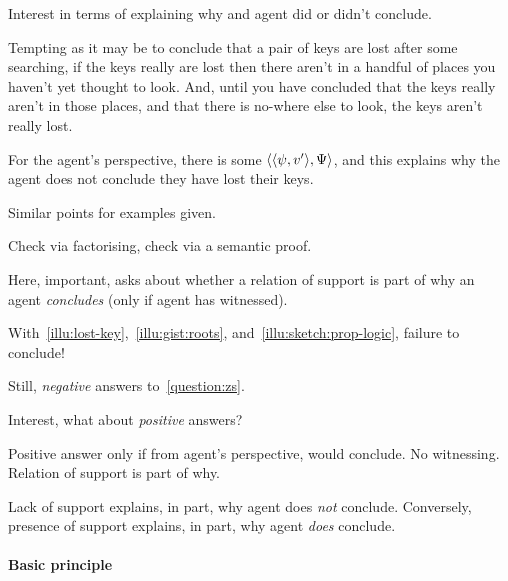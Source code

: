 \begin{note}
  {
    \color{red}
    Interest in terms of explaining why and agent did or didn't conclude.
  }

  \begin{illustration}
    \label{illu:lost-key}
    Tempting as it may be to conclude that a pair of keys are lost after some searching, if the keys really are lost then there aren't in a handful of places you haven't yet thought to look. And, until you have concluded that the keys really aren't in those places, and that there is no-where else to look, the keys aren't really lost.
  \end{illustration}

  For the agent's perspective, there is some \(\langle \langle \psi, v' \rangle, \Psi \rangle\), and this explains why the agent does not conclude they have lost their keys.
\end{note}

\begin{note}
  Similar points for examples given.

  Check via factorising, check via a semantic proof.
\end{note}

\begin{note}
  Here, important, \issueConstraint{} asks about whether a relation of support is part of why an agent \emph{concludes} (only if agent has witnessed).

  With~\autoref{illu:lost-key},~\autoref{illu:gist:roots}, and~\autoref{illu:sketch:prop-logic}, failure to conclude!
\end{note}

\begin{note}
  Still, \emph{negative} answers to~\autoref{question:zs}.

  Interest, what about \emph{positive} answers?

  Positive answer only if from agent's perspective, would conclude.
  No witnessing.
  Relation of support is part of why.

  Lack of support explains, in part, why agent does \emph{not} conclude.
  Conversely, presence of support explains, in part, why agent \emph{does} conclude.
\end{note}

\paragraph{Basic principle}

